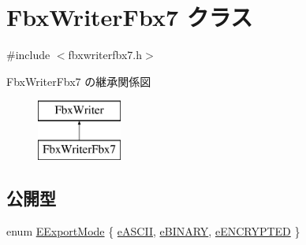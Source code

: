 \hypertarget{class_fbx_writer_fbx7}{}\section{Fbx\+Writer\+Fbx7 クラス}
\label{class_fbx_writer_fbx7}


{\ttfamily \#include $<$fbxwriterfbx7.\+h$>$}

Fbx\+Writer\+Fbx7 の継承関係図\begin{figure}[H]
\begin{center}
\leavevmode
\includegraphics[height=2.000000cm]{class_fbx_writer_fbx7}
\end{center}
\end{figure}
\subsection*{公開型}
\begin{DoxyCompactItemize}
\item 
enum \hyperlink{class_fbx_writer_fbx7_a07b7bcbb11c9befcbd0eacd265458005}{E\+Export\+Mode} \{ \hyperlink{class_fbx_writer_fbx7_a07b7bcbb11c9befcbd0eacd265458005a9c649ae90e48a57517f8f0f58fa5e4d0}{e\+A\+S\+C\+II}, 
\hyperlink{class_fbx_writer_fbx7_a07b7bcbb11c9befcbd0eacd265458005ae35342b371e32d2059779877d6a48233}{e\+B\+I\+N\+A\+RY}, 
\hyperlink{class_fbx_writer_fbx7_a07b7bcbb11c9befcbd0eacd265458005acf6f86dc6ac9f629d312d997e35b5b14}{e\+E\+N\+C\+R\+Y\+P\+T\+ED}
 \}
\end{DoxyCompactItemize}
